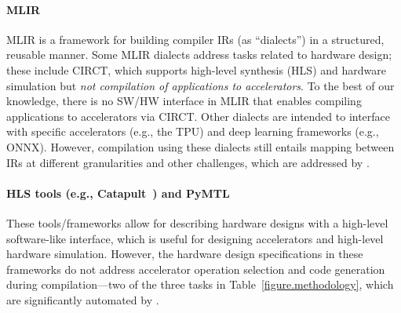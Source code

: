 \paragraph{MLIR~\cite{lattner2021mlir}} 
MLIR is a framework for building 
compiler IRs (as ``dialects'') in a structured, reusable manner.
Some MLIR dialects address tasks related to hardware design; these include CIRCT, which supports high-level synthesis (HLS) and hardware simulation but \emph{not compilation of applications to accelerators}. To the best of our knowledge, there is no SW/HW interface in MLIR that enables compiling applications to accelerators via CIRCT. Other dialects are intended to interface with specific accelerators (e.g., the TPU) and deep learning frameworks (e.g., ONNX).
However, compilation using these dialects still entails mapping between IRs at different granularities and other challenges, which are addressed by \TLA.

\paragraph{HLS tools (e.g., Catapult~\cite{siemens-catapulthls}) and PyMTL~\cite{batten2018pymtl}} 
These tools/frameworks allow for describing hardware designs with a high-level software-like interface, which is useful for designing accelerators and high-level hardware simulation. However, the hardware design specifications in these frameworks do not address accelerator operation selection and code generation during compilation---two of the three tasks in Table~\ref{figure.methodology}, which 
are significantly automated by {\TLA}. 

